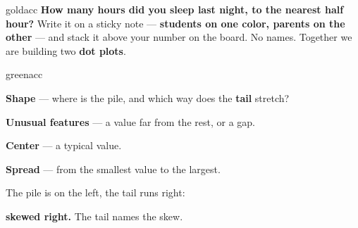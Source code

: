 \documentclass[12pt]{article}
\begin{document}

\vspace{0.1in}

\boxguard
\begin{scenariobox}{goldacc}
\textbf{How many hours did you sleep last night, to the nearest half hour?} Write it on a
sticky note --- \textbf{students on one color, parents on the other} --- and stack it above
your number on the board. No names. Together we are building two \textbf{dot plots}.
\end{scenariobox}

\vspace{0.08in}
\boxguard[30]
\begin{scenariobox}{greenacc}
\begin{minipage}[t]{0.55\linewidth}\vspace{0pt}\raggedright
\textbf{Shape} --- where is the pile, and which way does the \textbf{tail} stretch?\par\vspace{3pt}
\textbf{Unusual features} --- a value far from the rest, or a gap.\par\vspace{3pt}
\textbf{Center} --- a typical value.\par\vspace{3pt}
\textbf{Spread} --- from the smallest value to the largest.
\end{minipage}\hfill
\begin{minipage}[t]{0.42\linewidth}\vspace{0pt}\centering
{}\par\vspace{2pt}
{\small The pile is on the left, the tail runs right:\par
\textbf{skewed right.} The tail names the skew.}
\end{minipage}
\end{scenariobox}
\end{document}
